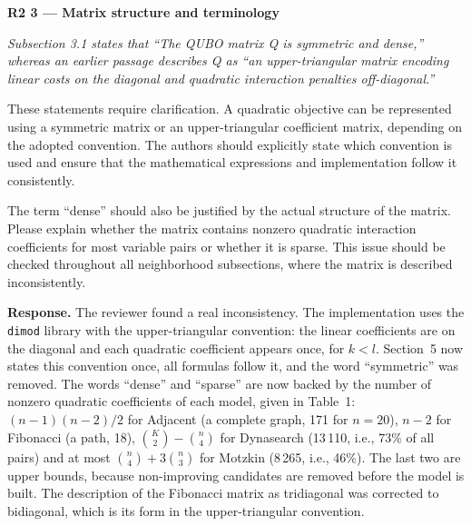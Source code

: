\documentclass[12pt]{article}
\newenvironment{rc}[1]{\par\medskip\noindent\textbf{#1}\par\nopagebreak\noindent\itshape\renewcommand{\emph}[1]{\textbf{##1}}\ignorespaces}{\par}
\newcommand{\answer}[1]{\par\smallskip\noindent\textbf{Response.} #1\par}
\begin{document}
\begin{rc}{R2 3 --- Matrix structure and terminology}
Subsection 3.1 states that ``The QUBO matrix Q is symmetric and dense,'' whereas an earlier passage describes Q as ``an upper-triangular matrix encoding linear costs on the diagonal and quadratic interaction penalties off-diagonal.''

These statements require clarification. A quadratic objective can be represented using a symmetric matrix or an upper-triangular coefficient matrix, depending on the adopted convention. The authors should explicitly state which convention is used and ensure that the mathematical expressions and implementation follow it consistently.

The term ``dense'' should also be justified by the actual structure of the matrix. Please explain whether the matrix contains nonzero quadratic interaction coefficients for most variable pairs or whether it is sparse. This issue should be checked throughout all neighborhood subsections, where the matrix is described inconsistently.
\end{rc}
\answer{The reviewer found a real inconsistency. The implementation uses the \texttt{dimod} library with the upper-triangular convention: the linear coefficients are on the diagonal and each quadratic coefficient appears once, for $k<l$. Section~5 now states this convention once, all formulas follow it, and the word ``symmetric'' was removed. The words ``dense'' and ``sparse'' are now backed by the number of nonzero quadratic coefficients of each model, given in Table~1: $(n-1)(n-2)/2$ for Adjacent (a complete graph, 171 for $n=20$), $n-2$ for Fibonacci (a path, 18), $\binom{K}{2}-\binom{n}{4}$ for Dynasearch (13\,110, i.e., 73\% of all pairs) and at most $\binom{n}{4}+3\binom{n}{3}$ for Motzkin (8\,265, i.e., 46\%). The last two are upper bounds, because non-improving candidates are removed before the model is built. The description of the Fibonacci matrix as tridiagonal was corrected to bidiagonal, which is its form in the upper-triangular convention.}
\end{document}
